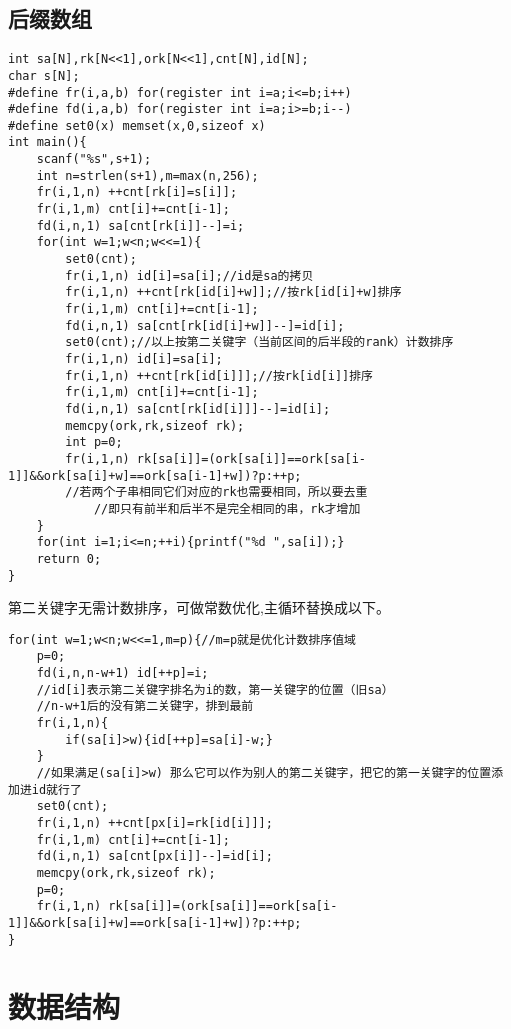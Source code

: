 \documentclass[UTF8]{ctexart}
\begin{document}
\subsection{后缀数组}
\begin{lstlisting}
int sa[N],rk[N<<1],ork[N<<1],cnt[N],id[N];
char s[N];
#define fr(i,a,b) for(register int i=a;i<=b;i++)
#define fd(i,a,b) for(register int i=a;i>=b;i--)
#define set0(x) memset(x,0,sizeof x)
int main(){
    scanf("%s",s+1);
    int n=strlen(s+1),m=max(n,256);
    fr(i,1,n) ++cnt[rk[i]=s[i]];
    fr(i,1,m) cnt[i]+=cnt[i-1];
    fd(i,n,1) sa[cnt[rk[i]]--]=i;
    for(int w=1;w<n;w<<=1){
        set0(cnt);
        fr(i,1,n) id[i]=sa[i];//id是sa的拷贝 
        fr(i,1,n) ++cnt[rk[id[i]+w]];//按rk[id[i]+w]排序 
        fr(i,1,m) cnt[i]+=cnt[i-1];
        fd(i,n,1) sa[cnt[rk[id[i]+w]]--]=id[i];
        set0(cnt);//以上按第二关键字（当前区间的后半段的rank）计数排序 
        fr(i,1,n) id[i]=sa[i];
        fr(i,1,n) ++cnt[rk[id[i]]];//按rk[id[i]]排序 
        fr(i,1,m) cnt[i]+=cnt[i-1];
        fd(i,n,1) sa[cnt[rk[id[i]]]--]=id[i];
        memcpy(ork,rk,sizeof rk);
        int p=0;
        fr(i,1,n) rk[sa[i]]=(ork[sa[i]]==ork[sa[i-1]]&&ork[sa[i]+w]==ork[sa[i-1]+w])?p:++p;
        //若两个子串相同它们对应的rk也需要相同，所以要去重
            //即只有前半和后半不是完全相同的串，rk才增加 
    }
    for(int i=1;i<=n;++i){printf("%d ",sa[i]);}
    return 0;
}
\end{lstlisting}
第二关键字无需计数排序，可做常数优化,主循环替换成以下。
\begin{lstlisting}
for(int w=1;w<n;w<<=1,m=p){//m=p就是优化计数排序值域
    p=0;
    fd(i,n,n-w+1) id[++p]=i;
    //id[i]表示第二关键字排名为i的数，第一关键字的位置（旧sa） 
    //n-w+1后的没有第二关键字，排到最前 
    fr(i,1,n){
        if(sa[i]>w){id[++p]=sa[i]-w;}
    }
    //如果满足(sa[i]>w) 那么它可以作为别人的第二关键字，把它的第一关键字的位置添加进id就行了
    set0(cnt);
    fr(i,1,n) ++cnt[px[i]=rk[id[i]]];
    fr(i,1,m) cnt[i]+=cnt[i-1];
    fd(i,n,1) sa[cnt[px[i]]--]=id[i];
    memcpy(ork,rk,sizeof rk);
    p=0;
    fr(i,1,n) rk[sa[i]]=(ork[sa[i]]==ork[sa[i-1]]&&ork[sa[i]+w]==ork[sa[i-1]+w])?p:++p;
}
\end{lstlisting}
\section{数据结构}
\end{document}

